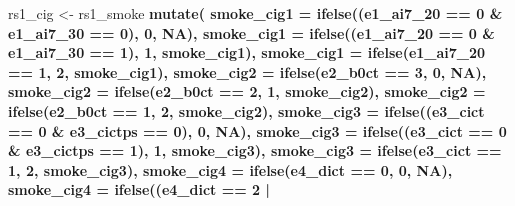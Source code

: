 \documentclass[]{book}
\newenvironment{Shaded}{\begin{snugshade}}{\end{snugshade}}
\newcommand{\DataTypeTok}[1]{\textcolor[rgb]{0.13,0.29,0.53}{#1}}
\newcommand{\DecValTok}[1]{\textcolor[rgb]{0.00,0.00,0.81}{#1}}
\newcommand{\KeywordTok}[1]{\textcolor[rgb]{0.13,0.29,0.53}{\textbf{#1}}}
\newcommand{\NormalTok}[1]{#1}
\newcommand{\OperatorTok}[1]{\textcolor[rgb]{0.81,0.36,0.00}{\textbf{#1}}}
\newcommand{\OtherTok}[1]{\textcolor[rgb]{0.56,0.35,0.01}{#1}}
\newcommand{\StringTok}[1]{\textcolor[rgb]{0.31,0.60,0.02}{#1}}
\begin{document}
\begin{Shaded}
\begin{Highlighting}[]
\NormalTok{rs1_cig <-}\StringTok{ }\NormalTok{rs1_smoke }\OperatorTok{%
\StringTok{  }\KeywordTok{mutate}\NormalTok{(}
    \DataTypeTok{smoke_cig1 =} \KeywordTok{ifelse}\NormalTok{((e1_ai7_}\DecValTok{20} \OperatorTok{==}\StringTok{ }\DecValTok{0} \OperatorTok{&}\StringTok{ }\NormalTok{e1_ai7_}\DecValTok{30} \OperatorTok{==}\StringTok{ }\DecValTok{0}\NormalTok{), }\DecValTok{0}\NormalTok{, }\OtherTok{NA}\NormalTok{),}
    \DataTypeTok{smoke_cig1 =} \KeywordTok{ifelse}\NormalTok{((e1_ai7_}\DecValTok{20} \OperatorTok{==}\StringTok{ }\DecValTok{0} \OperatorTok{&}
\StringTok{                           }\NormalTok{e1_ai7_}\DecValTok{30} \OperatorTok{==}\StringTok{ }\DecValTok{1}\NormalTok{), }\DecValTok{1}\NormalTok{, smoke_cig1),}
    \DataTypeTok{smoke_cig1 =} \KeywordTok{ifelse}\NormalTok{(e1_ai7_}\DecValTok{20} \OperatorTok{==}\StringTok{ }\DecValTok{1}\NormalTok{, }\DecValTok{2}\NormalTok{, smoke_cig1),}
    \DataTypeTok{smoke_cig2 =} \KeywordTok{ifelse}\NormalTok{(e2_b0ct }\OperatorTok{==}\StringTok{ }\DecValTok{3}\NormalTok{, }\DecValTok{0}\NormalTok{, }\OtherTok{NA}\NormalTok{),}
    \DataTypeTok{smoke_cig2 =} \KeywordTok{ifelse}\NormalTok{(e2_b0ct }\OperatorTok{==}\StringTok{ }\DecValTok{2}\NormalTok{, }\DecValTok{1}\NormalTok{, smoke_cig2),}
    \DataTypeTok{smoke_cig2 =} \KeywordTok{ifelse}\NormalTok{(e2_b0ct }\OperatorTok{==}\StringTok{ }\DecValTok{1}\NormalTok{, }\DecValTok{2}\NormalTok{, smoke_cig2),}
    \DataTypeTok{smoke_cig3 =} \KeywordTok{ifelse}\NormalTok{((e3_cict }\OperatorTok{==}\StringTok{ }\DecValTok{0} \OperatorTok{&}
\StringTok{                           }\NormalTok{e3_cictps }\OperatorTok{==}\StringTok{ }\DecValTok{0}\NormalTok{), }\DecValTok{0}\NormalTok{, }\OtherTok{NA}\NormalTok{),}
    \DataTypeTok{smoke_cig3 =} \KeywordTok{ifelse}\NormalTok{((e3_cict }\OperatorTok{==}\StringTok{ }\DecValTok{0} \OperatorTok{&}
\StringTok{                           }\NormalTok{e3_cictps }\OperatorTok{==}\StringTok{ }\DecValTok{1}\NormalTok{), }\DecValTok{1}\NormalTok{, smoke_cig3),}
    \DataTypeTok{smoke_cig3 =} \KeywordTok{ifelse}\NormalTok{(e3_cict }\OperatorTok{==}\StringTok{ }\DecValTok{1}\NormalTok{, }\DecValTok{2}\NormalTok{, smoke_cig3),}
    \DataTypeTok{smoke_cig4 =} \KeywordTok{ifelse}\NormalTok{(e4_dict }\OperatorTok{==}\StringTok{ }\DecValTok{0}\NormalTok{, }\DecValTok{0}\NormalTok{, }\OtherTok{NA}\NormalTok{),}
    \DataTypeTok{smoke_cig4 =} \KeywordTok{ifelse}\NormalTok{((e4_dict }\OperatorTok{==}\StringTok{ }\DecValTok{2} \OperatorTok{|}
}
\end{Highlighting}
\end{Shaded}
\end{document}
